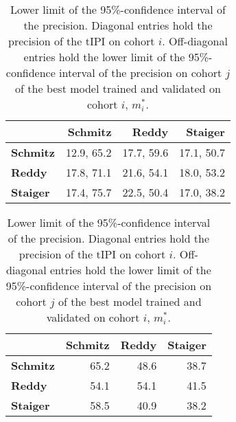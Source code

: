 \begin{table}
    \centering
    \begin{subtable}{\textwidth}
        \centering
        \begin{tabular}{lrrr}
            \hline
            & \textbf{Schmitz} & \textbf{Reddy} & \textbf{Staiger} \\
            \hline
            \textbf{Schmitz} & \num{12.9}, \num{65.2} & \num{17.7}, \num{59.6} & \num{17.1}, \num{50.7} \\
            \textbf{Reddy} & \num{17.8}, \num{71.1} & \num{21.6}, \num{54.1} & \num{18.0}, \num{53.2} \\
            \textbf{Staiger} & \num{17.4}, \num{75.7} & \num{22.5}, \num{50.4} & \num{17.0}, \num{38.2} \\
            \hline
        \end{tabular}
        \caption{Prevalence and precision.
            Diagonal entries $(i, i)$ hold prevalence, precision of the $\text{tIPI}$ on 
            cohort $i$. Off-diagonal entries $(i, j)$ hold prevalence, precision on cohort $j$ of 
            the best model trained and validated on cohort $i$, $m_i^*$.}\label{subtab:inter-prev-prec}
    \end{subtable}

    \vspace{0.5cm}
    \begin{subtable}{\textwidth}
        \centering
        \begin{tabular}{lrrr}
            \hline
            & \textbf{Schmitz} & \textbf{Reddy} & \textbf{Staiger} \\
            \hline
            \textbf{Schmitz} & \num{65.2} & \num{48.6} & \num{38.7} \\
            \textbf{Reddy} & \num{54.1} & \num{54.1} & \num{41.5} \\
            \textbf{Staiger} & \num{58.5} & \num{40.9} & \num{38.2} \\
            \hline
        \end{tabular}
        \caption{Lower limit of the \num{95}\%-confidence interval of the precision.
            Diagonal entries hold the precision of the $\text{tIPI}$ on cohort $i$. Off-diagonal 
            entries hold the lower limit of the \num{95}\%-confidence interval of the precision on 
            cohort $j$ of the best model trained and validated on cohort $i$, $m_i^*$.}
            \label{subtab:inter-prec-ci}
    \end{subtable}


\end{table}
